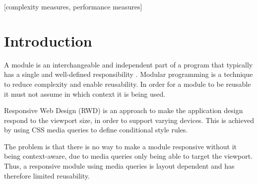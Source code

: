 \documentclass{acm_proc_article-sp}
\begin{document}
\date{10 October 2015}

\maketitle
\begin{abstract}

\end{abstract}

[complexity measures, performance measures]



\section{Introduction}

  A module is an interchangeable and independent part of a program that typically has a single and well-defined responsibility \cite{parnas1972criteria}.
  Modular programming is a technique to reduce complexity and enable reusability.
  In order for a module to be reusable it must not assume in which context it is being used.

  Responsive Web Design (RWD) is an approach to make the application design respond to the viewport size, in order to support varying devices.
  This is achieved by using CSS media queries to define conditional style rules.

  The problem is that there is no way to make a module responsive without it being context-aware, due to media queries only being able to target the viewport.
  Thus, a responsive module using media queries is layout dependent and has therefore limited reusability.
\end{document}
